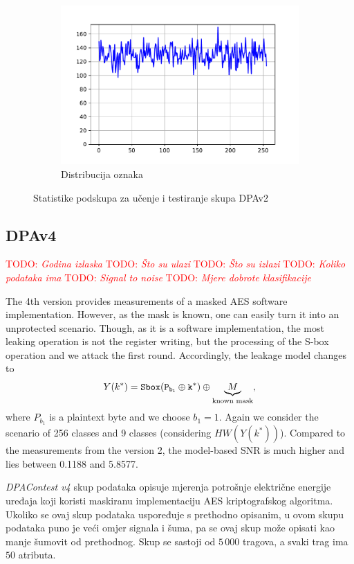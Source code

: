 \documentclass[times, utf8, numeric, diplomski]{fer}
\def\SBOX#1{\tt Sbox(#1)}
\def\TODO#1{\noindent\textcolor{red}{TODO: \textit{#1}}\newline}
\def\todo#1{\TODO{#1}}
\begin{document}
\begin{figure}[H]
\begin{subfigure}{.5\textwidth}
\includegraphics[width=\textwidth]{ds_nl256_ts_outputs.pdf}
\centering
\caption{Distribucija oznaka}
\label{fig:dpa2_test_outputs}
\end{subfigure}
\caption{Statistike podskupa za učenje i testiranje skupa DPAv2}
\end{figure}

\subsection{DPAv4}
\todo{Godina izlaska}
\todo{Što su ulazi}
\todo{Što su izlazi}
\todo{Koliko podataka ima}
\todo{Signal to noise}
\todo{Mjere dobrote klasifikacije}

The 4th version provides measurements of a masked AES software implementation. However, as the mask is known, one can easily turn it into an unprotected scenario.
Though, as it is a software implementation, the most leaking operation is not the register writing, but the processing of the S-box operation and we attack the first round. 
Accordingly, the leakage model changes to
\begin{equation}
\label{eq:dpav4}
Y(k^*) = \SBOX{P_{b_1} \oplus k^{*}} \oplus \underbrace{M}_{\text{known mask}},
\end{equation}
where $P_{b_1}$ is a plaintext byte and we choose $b_1 = 1$. Again we consider the scenario of 256 classes and 9 classes (considering $HW(Y(k^*))$).
Compared to the measurements from the version 2, the model-based SNR is much higher and lies between 0.1188 and 5.8577.

\textit{DPAContest v4} skup podataka opisuje mjerenja potrošnje električne energije uređaja koji koristi maskiranu implementaciju AES kriptografskog algoritma. Ukoliko se ovaj skup podataka uspoređuje s prethodno opisanim, u ovom skupu podataka puno je veći omjer signala i šuma, pa se ovaj skup može opisati kao manje šumovit od prethodnog. Skup se sastoji od $5\,000$ tragova, a svaki trag ima $50$ atributa.
\end{document}
